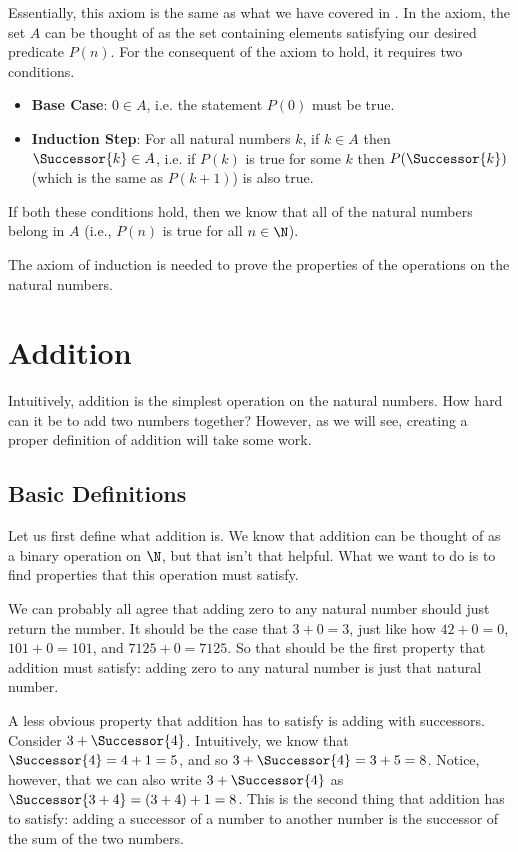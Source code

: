 Essentially, this axiom is the same as what we have covered in . In the axiom, the set $A$ can be thought of as the set containing elements satisfying our desired predicate $P(n)$. For the consequent of the axiom to hold, it requires two conditions.
\begin{itemize}
    \item \textbf{Base Case}: $0 \in A$, i.e. the statement $P(0)$ must be true.
    \item \textbf{Induction Step}: For all natural numbers $k$, if $k \in A$ then $\Successor{k} \in A$, i.e. if $P(k)$ is true for some $k$ then $P(\Successor{k})$ (which is the same as $P(k+1)$) is also true.
\end{itemize}
If both these conditions hold, then we know that all of the natural numbers belong in $A$ (i.e., $P(n)$ is true for all $n \in \N$).

The axiom of induction is needed to prove the properties of the operations on the natural numbers.

\section{Addition}
Intuitively, addition is the simplest operation on the natural numbers. How hard can it be to add two numbers together? However, as we will see, creating a proper definition of addition will take some work.

\subsection{Basic Definitions}
Let us first define what addition is. We know that addition can be thought of as a binary operation on $\N$, but that isn't that helpful. What we want to do is to find properties that this operation must satisfy.

We can probably all agree that adding zero to any natural number should just return the number. It should be the case that $3 + 0 = 3$, just like how $42 + 0 = 0$, $101 + 0 = 101$, and $7125 + 0 = 7125$. So that should be the first property that addition must satisfy: adding zero to any natural number is just that natural number.

A less obvious property that addition has to satisfy is adding with successors. Consider $3 + \Successor{4}$. Intuitively, we know that $\Successor{4} = 4 + 1 = 5$, and so $3 + \Successor{4} = 3 + 5 = 8$. Notice, however, that we can also write $3 + \Successor{4}$ as $\Successor{3 + 4} = (3 + 4) + 1 = 8$. This is the second thing that addition has to satisfy: adding a successor of a number to another number is the successor of the sum of the two numbers.

